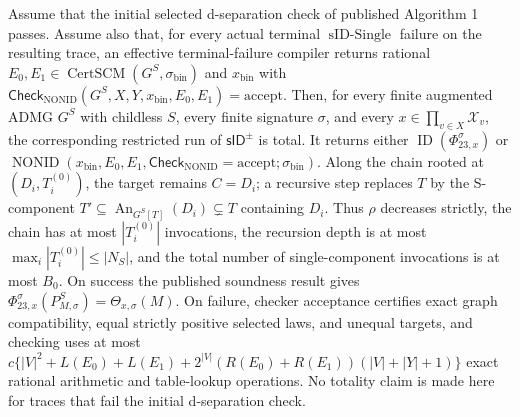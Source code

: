 Assume that the initial selected d-separation check of published Algorithm 1 passes. Assume also that, for every actual terminal \(\operatorname{sID\text{-}Single}\) failure on the resulting trace, an effective terminal-failure compiler returns rational \(E_0,E_1\in\operatorname{CertSCM}(G^S,\sigma_{\mathrm{bin}})\) and \(x_{\mathrm{bin}}\) with \(\mathsf{Check}_{\mathrm{NONID}}(G^S,X,Y,x_{\mathrm{bin}},E_0,E_1)=\mathrm{accept}\). Then, for every finite augmented ADMG \(G^S\) with childless \(S\), every finite signature \(\sigma\), and every \(x\in\prod_{v\in X}\mathcal X_v\), the corresponding restricted run of \(\mathsf{sID}^{\pm}\) is total. It returns either \(\operatorname{ID}(\Phi_{23,x}^{\sigma})\) or \(\operatorname{NONID}(x_{\mathrm{bin}},E_0,E_1,\mathsf{Check}_{\mathrm{NONID}}=\mathrm{accept};\sigma_{\mathrm{bin}})\). Along the chain rooted at \((D_i,T_i^{(0)})\), the target remains \(C=D_i\); a recursive step replaces \(T\) by the S-component \(T'\subseteq\operatorname{An}_{G^S[T]}(D_i)\subsetneq T\) containing \(D_i\). Thus \(\rho\) decreases strictly, the chain has at most \(|T_i^{(0)}|\) invocations, the recursion depth is at most \(\max_i|T_i^{(0)}|\le|N_S|\), and the total number of single-component invocations is at most \(B_0\). On success the published soundness result gives \(\Phi_{23,x}^{\sigma}(P_{M,\sigma}^S)=\Theta_{x,\sigma}(M)\). On failure, checker acceptance certifies exact graph compatibility, equal strictly positive selected laws, and unequal targets, and checking uses at most \(c\{|V|^2+L(E_0)+L(E_1)+2^{|V|}(R(E_0)+R(E_1))(|V|+|Y|+1)\}\) exact rational arithmetic and table-lookup operations. No totality claim is made here for traces that fail the initial d-separation check.